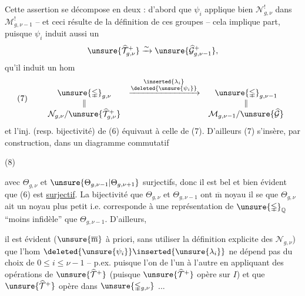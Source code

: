 
Cette assertion se décompose en deux :  d'abord que $\psi_i$ applique bien $\mathcal N_{g,\nu}^{!}$ dans $\mathcal M_{g,\nu-1}^{!}$ -- et ceci résulte de la définition  de ces groupes -- cela implique  part, puisque $\psi_i$ induit aussi un  
\[
\unsure{\widehat{\mathcal T}_{g,\nu}^{+}}
\xrightarrow{\sim}
\unsure{\widehat{\mathcal G}_{g,\nu-1}^{+}},
\]
qu'il induit un hom
\[
(7)\qquad
\begin{array}{ccc}
\unsure{\mathbb{\Gamma}}_{g,\nu}
&\xrightarrow{\substack{\inserted{\lambda_i}\\\deleted{\unsure{\psi_i}}}}&
\unsure{\mathbb{\Gamma}}_{g,\nu-1}\\
\Vert&&\Vert\\
\mathcal N_{g,\nu}/\unsure{\widehat{\mathcal T}_{g,\nu}^{+}}
&&\mathcal M_{g,\nu-1}/\unsure{\widehat{\mathcal G}}
\end{array}
\]
et l'inj. (resp. bijectivité) de (6) équivaut à celle de (7). D'ailleurs (7) s'insère, par construction, dans un diagramme commutatif

(8)\quad{}

avec $\Theta_{g,\nu}$ et $\unsure{\Theta_{g,\nu-1}|\Theta_{g,\nu+1}}$ surjectifs, donc il est bel et bien évident que (6) est \uline{surjectif}. La bijectivité  que $\Theta_{g,\nu}$ et $\Theta_{g,\nu-1}$ ont $\overline{\mathrm m}$ noyau   il se  que $\Theta_{g,\nu}$ ait un noyau plus petit i.e. corresponde à une représentation de $\unsure{\mathbb{\Gamma}}_{\mathbb Q}$ ``moins infidèle'' que $\Theta_{g,\nu-1}$. D'ailleurs,


il est évident  ($\unsure{\overline{\mathrm m}}$ à priori, sans utiliser la définition  explicite des $\mathcal N_{g,\nu}$) que l'hom $\deleted{\unsure{\psi_i}}\inserted{\unsure{\lambda_i}}$  ne dépend pas du choix de $0\leq i\leq\nu-1$ -- p.ex. puisque l'on  de l'un à l'autre en appliquant des opérations de $\unsure{\widehat{\mathcal T}^{+}}$ (puisque $\unsure{\widehat{\mathcal T}^{+}}$ opère  sur $I$) et que $\unsure{\widehat{\mathcal T}^{+}}$ opère  dans $\unsure{\mathbb{\Gamma}_{g,\nu}}$ ...


